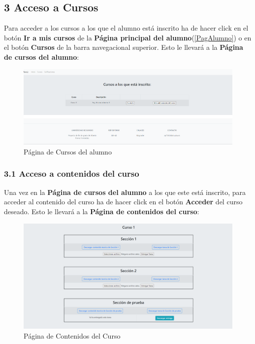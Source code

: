 \subsection{3 Acceso a Cursos}
Para acceder a los cursos a los que el alumno está inscrito ha de hacer click en el botón \textbf{Ir a mis cursos} de la \textbf{Página principal del alumno}(\ref{PagAlumno}) o en el botón \textbf{Cursos} de la barra navegacional superior. Esto le llevará a la \textbf{Página de cursos del alumno}:
\begin{figure}[H]
\centering
\includegraphics[width=\textwidth]{img/imgs-memoria/CursosAlumno.PNG}
\caption{Página de Cursos del alumno}
\label{PagCurAlu}
\end{figure}

\subsubsection{3.1 Acceso a contenidos del curso}
Una vez en la \textbf{Página de cursos del alumno} a los que este está inscrito, para acceder al contenido del curso ha de hacer click en el botón \textbf{Acceder} del curso deseado. Esto le llevará a la \textbf{Página de contenidos del curso}:

\begin{figure}[H]
\centering
\includegraphics[width=\textwidth]{img/imgs-memoria/ContenidoCurso.PNG}
\caption{Página de Contenidos del Curso}
\label{PagContentAlu}
\end{figure}

